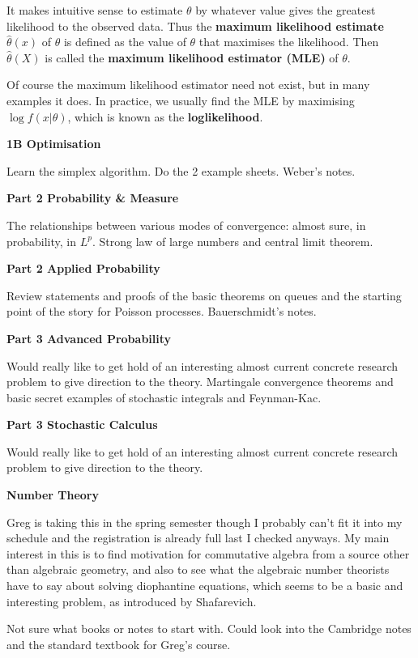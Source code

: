 \documentclass[hidelinks, 12pt]{article}
\theoremstyle{mydefstyle}
\theoremstyle{mythmstyle}
\begin{document}
It makes intuitive sense to estimate $\theta$ by whatever value gives the greatest likelihood to the observed data. Thus the \textbf{maximum likelihood estimate} $\hat{\theta}(x)$ of $\theta$ is defined as the value of $\theta$ that maximises the likelihood. Then $\hat{\theta}(X)$ is called the \textbf{maximum likelihood estimator (MLE)} of $\theta$. 

Of course the maximum likelihood estimator need not exist, but in many examples it does. In practice, we usually find the MLE by maximising $\log f(x\vert\theta)$, which is known as the \textbf{loglikelihood}. 

\textbf{1B Optimisation}

Learn the simplex algorithm. Do the 2 example sheets. Weber's notes. 

\textbf{Part 2 Probability \& Measure}

The relationships between various modes of convergence: almost sure, in probability, in $L^p$. Strong law of large numbers and central limit theorem. 

\textbf{Part 2 Applied Probability}

Review statements and proofs of the basic theorems on queues and the starting point of the story for Poisson processes. Bauerschmidt's notes. 

\textbf{Part 3 Advanced Probability}

Would really like to get hold of an interesting almost current concrete research problem to give direction to the theory. Martingale convergence theorems and basic secret examples of stochastic integrals and Feynman-Kac. 

\textbf{Part 3 Stochastic Calculus}

Would really like to get hold of an interesting almost current concrete research problem to give direction to the theory. 

\textbf{Number Theory}

Greg is taking this in the spring semester though I probably can't fit it into my schedule and the registration is already full last I checked anyways. My main interest in this is to find motivation for commutative algebra from a source other than algebraic geometry, and also to see what the algebraic number theorists have to say about solving diophantine equations, which seems to be a basic and interesting problem, as introduced by Shafarevich. 

Not sure what books or notes to start with. Could look into the Cambridge notes and the standard textbook for Greg's course. 
\end{document}
